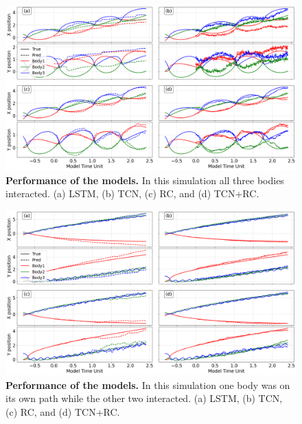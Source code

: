 \documentclass[%
 reprint,
 amsmath,amssymb,
 aps,
]{revtex4-2}
\begin{document}
\begin{figure}[htbp] %
    \centering
    \includegraphics[width=\linewidth]{plot_1_Final_Allplots_22x12.png}
    \caption{\textbf{Performance of the models.} In this simulation all three bodies interacted. (a) LSTM, (b) TCN, (c) RC, and (d) TCN+RC.}
    \label{fig:prediction_set_1_results}
\end{figure}


\begin{figure}[htbp]
    \centering
    \includegraphics[width=\linewidth]{plot_3_Final_Allplots_22x12.png}
    \caption{\textbf{Performance of the models.} In this simulation one body was on its own path while the other two interacted. (a) LSTM, (b) TCN, (c) RC, and (d) TCN+RC.}
    \label{fig:prediction_set_2_results}
\end{figure}
\end{document}
